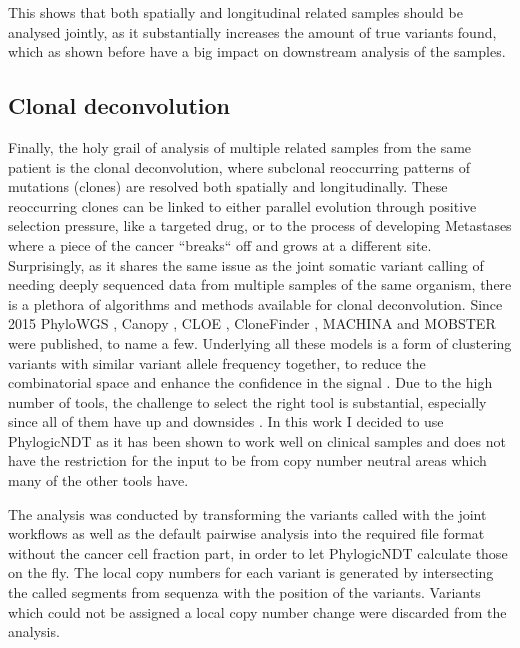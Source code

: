 This shows that both spatially and longitudinal related samples should be analysed jointly, as it substantially increases the amount of true variants found, which as shown before have a big impact on downstream analysis of the samples.



\subsection[Clonal deconvolution]{Clonal deconvolution}
\label{variantcalling-sec:clonal}

Finally, the holy grail of analysis of multiple related samples from the same patient is the clonal deconvolution, where subclonal reoccurring patterns of mutations (clones) are resolved both spatially and longitudinally. These reoccurring clones can be linked to either parallel evolution through positive selection pressure, like a targeted drug, or to the process of developing Metastases where a piece of the cancer ``breaks`` off and grows at a different site.
Surprisingly, as it shares the same issue as the joint somatic variant calling of needing deeply sequenced data from multiple samples of the same organism, there is a plethora of algorithms and methods available for clonal deconvolution. Since 2015 PhyloWGS \cite{Deshwar2015}, Canopy \cite{Jiang2016}, CLOE \cite{Marass2016}, CloneFinder \cite{Miura2018}, MACHINA \cite{ElKebir2018} and MOBSTER \cite{Caravagna2020} were published, to name a few. Underlying all these models is a form of clustering variants with similar variant allele frequency together, to reduce the combinatorial space and enhance the confidence in the signal \cite{Tarabichi2021}. Due to the high number of tools, the challenge to select the right tool is substantial, especially since all of them have up and downsides \cite{Miura2020}. In this work I decided to use PhylogicNDT \cite{Leshchiner2018} as it has been shown to work well on clinical samples \cite{Gerstung2020} and does not have the restriction for the input to be from copy number neutral areas which many of the other tools have.

The analysis was conducted by transforming the variants called with the joint workflows as well as the default pairwise analysis into the required file format without the cancer cell fraction part, in order to let PhylogicNDT calculate those on the fly. The local copy numbers for each variant is generated by intersecting the called segments from sequenza with the position of the variants. Variants which could not be assigned a local copy number change were discarded from the analysis.

